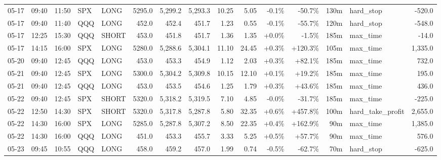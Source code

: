 \documentclass[11pt,a4paper,twoside]{article}
\begin{document}
\begin{landscape}
\begin{center}
\begin{longtable}{>{\color{txtmain}}l l l l l r r r r r r r r >{\color{txtmain}}l r}
05-17 & 09:40 & 11:50 & SPX & LONG & 5295.0 & 5,299.2 & 5,293.3 & 10.25 & 5.05 & \textcolor{lossred}{-0.1\%} & \textcolor{lossred}{-50.7\%} & 130m & hard\_stop & \textcolor{lossred}{-520.0} \\
05-17 & 09:40 & 11:40 & QQQ & LONG & 452.0 & 452.4 & 451.7 & 1.23 & 0.55 & \textcolor{lossred}{-0.1\%} & \textcolor{lossred}{-55.7\%} & 120m & hard\_stop & \textcolor{lossred}{-548.0} \\
05-17 & 12:25 & 15:30 & QQQ & SHORT & 453.0 & 451.8 & 451.7 & 1.36 & 1.35 & \textcolor{wingreen}{+0.0\%} & \textcolor{lossred}{-1.5\%} & 185m & max\_time & \textcolor{lossred}{-14.0} \\
05-17 & 14:15 & 16:00 & SPX & LONG & 5280.0 & 5,288.6 & 5,304.1 & 11.10 & 24.45 & \textcolor{wingreen}{+0.3\%} & \textcolor{wingreen}{+120.3\%} & 105m & max\_time & \textcolor{wingreen}{1,335.0} \\
05-20 & 09:40 & 12:45 & QQQ & LONG & 453.0 & 453.3 & 454.9 & 1.12 & 2.03 & \textcolor{wingreen}{+0.3\%} & \textcolor{wingreen}{+82.1\%} & 185m & max\_time & \textcolor{wingreen}{732.0} \\
05-21 & 09:40 & 12:45 & SPX & LONG & 5300.0 & 5,304.2 & 5,309.8 & 10.15 & 12.10 & \textcolor{wingreen}{+0.1\%} & \textcolor{wingreen}{+19.2\%} & 185m & max\_time & \textcolor{wingreen}{195.0} \\
05-21 & 09:40 & 12:45 & QQQ & LONG & 453.0 & 453.5 & 454.6 & 1.25 & 1.79 & \textcolor{wingreen}{+0.3\%} & \textcolor{wingreen}{+43.6\%} & 185m & max\_time & \textcolor{wingreen}{436.0} \\
05-22 & 09:40 & 12:45 & SPX & SHORT & 5320.0 & 5,318.2 & 5,319.5 & 7.10 & 4.85 & \textcolor{lossred}{-0.0\%} & \textcolor{lossred}{-31.7\%} & 185m & max\_time & \textcolor{lossred}{-225.0} \\
05-22 & 12:50 & 14:30 & SPX & SHORT & 5320.0 & 5,317.8 & 5,287.8 & 5.80 & 32.35 & \textcolor{wingreen}{+0.6\%} & \textcolor{wingreen}{+457.8\%} & 100m & hard\_take\_profit & \textcolor{wingreen}{2,655.0} \\
05-22 & 14:30 & 16:00 & SPX & LONG & 5285.0 & 5,287.8 & 5,307.2 & 8.50 & 22.35 & \textcolor{wingreen}{+0.4\%} & \textcolor{wingreen}{+162.9\%} & 90m & max\_time & \textcolor{wingreen}{1,385.0} \\
05-22 & 14:30 & 16:00 & QQQ & LONG & 451.0 & 453.3 & 455.7 & 3.33 & 5.25 & \textcolor{wingreen}{+0.5\%} & \textcolor{wingreen}{+57.7\%} & 90m & max\_time & \textcolor{wingreen}{576.0} \\
05-23 & 09:45 & 10:55 & QQQ & LONG & 458.0 & 459.2 & 457.0 & 1.99 & 0.74 & \textcolor{lossred}{-0.5\%} & \textcolor{lossred}{-62.7\%} & 70m & hard\_stop & \textcolor{lossred}{-625.0} \\

\end{longtable}
\end{center}
\end{landscape}
\end{document}
